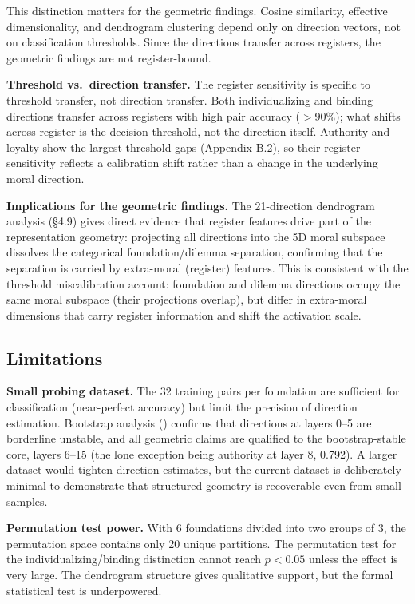 This distinction matters for the geometric findings. Cosine
similarity, effective dimensionality, and dendrogram clustering
depend only on direction vectors, not on classification thresholds.
Since the directions transfer across registers, the geometric
findings are not register-bound.

\textbf{Threshold vs.~direction transfer.} The register sensitivity is
specific to threshold transfer, not direction transfer. Both
individualizing and binding directions transfer across registers with
high pair accuracy (\(>90\)\%); what shifts across register is the
decision threshold, not the direction itself. Authority and loyalty
show the largest threshold gaps (Appendix B.2), so their register
sensitivity reflects a calibration shift rather than a change in the
underlying moral direction.

\textbf{Implications for the geometric findings.} The 21-direction
dendrogram analysis (\S4.9) gives direct evidence that register
features drive part of the representation geometry: projecting all
directions into the 5D moral subspace dissolves the categorical
foundation/dilemma separation, confirming that the separation is
carried by extra-moral (register) features. This is consistent with
the threshold miscalibration account: foundation and dilemma
directions occupy the same moral subspace (their projections
overlap), but differ in extra-moral dimensions that carry register
information and shift the activation scale.

\subsection{Limitations}\label{limitations}

\textbf{Small probing dataset.} The 32 training pairs per foundation
are sufficient for classification (near-perfect accuracy) but
limit the precision of direction estimation. Bootstrap analysis
() confirms that directions at layers 0--5 are borderline
unstable, and all geometric claims are qualified to the
bootstrap-stable core, layers 6--15 (the lone exception being
authority at layer 8, 0.792).
A larger dataset would tighten direction estimates, but the current
dataset is deliberately minimal to demonstrate that structured
geometry is recoverable even from small samples.

\textbf{Permutation test power.} With 6 foundations divided into two
groups of 3, the permutation space contains only 20 unique
partitions. The permutation test for the individualizing/binding
distinction cannot reach \(p < 0.05\) unless the effect is very
large. The dendrogram structure gives qualitative support, but
the formal statistical test is underpowered.

